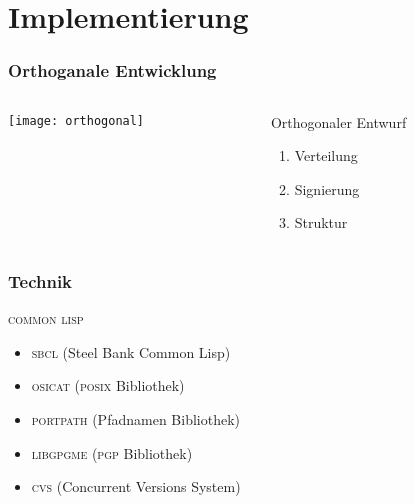 \documentclass[german]{beamer}
\newcommand{\PGP}{\textsc{pgp}}
\newcommand{\SBCL}{\textsc{sbcl}}
\newcommand{\CVS}{\textsc{cvs}}
\newcommand{\COMMONLISP}{\textsc{common lisp}}
\newcommand{\LIBGPGME}{\textsc{libgpgme}}
\newcommand{\OSICAT}{\textsc{osicat}}
\newcommand{\PORTPATH}{\textsc{portpath}}
\newcommand{\POSIX}{\textsc{posix}}
\begin{document}
\section{Implementierung}

\begin{frame}
  \frametitle{Orthoganale Entwicklung}
  \begin{columns}[c]
    \begin{column}{5cm}
      \texttt{[image: orthogonal]}
    \end{column}
    \begin{column}{7cm}
      \begin{block}{Orthogonaler Entwurf}
        \begin{enumerate}
        \item Verteilung 
        \item Signierung
        \item Struktur
        \end{enumerate}
      \end{block}

    \end{column}
  \end{columns}
\end{frame}

\begin{frame}
  \frametitle{Technik}
  \begin{block}{\COMMONLISP}
    \begin{itemize}
    \item \SBCL{} (Steel Bank Common Lisp)
    \item \OSICAT{} (\POSIX{} Bibliothek)
    \item \PORTPATH{} (Pfadnamen Bibliothek)
    \item \LIBGPGME{} (\PGP{} Bibliothek)
    \end{itemize}
  \end{block}
  \begin{block}{}
    \begin{itemize}
    \item \CVS{} (Concurrent Versions System)
    \end{itemize}
  \end{block}
\end{frame}

\end{document}
